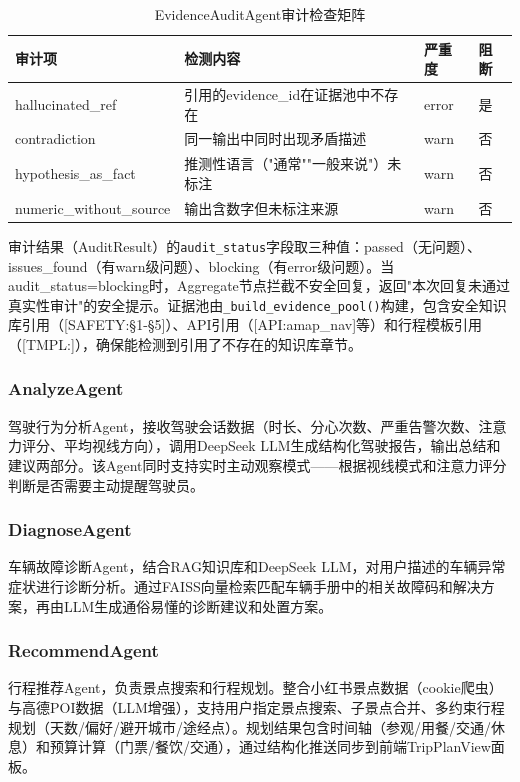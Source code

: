 \documentclass[a4paper]{article}
\begin{document}
\begin{table}[H]
  \centering
  \caption{EvidenceAuditAgent审计检查矩阵}
  \label{tab:audit_matrix}
  \begin{tabular}{llll}
  \toprule
  审计项 & 检测内容 & 严重度 & 阻断 \\
  \midrule
  hallucinated\_ref & 引用的evidence\_id在证据池中不存在 & error & 是 \\
  contradiction & 同一输出中同时出现矛盾描述 & warn & 否 \\
  hypothesis\_as\_fact & 推测性语言（"通常""一般来说"）未标注 & warn & 否 \\
  numeric\_without\_source & 输出含数字但未标注来源 & warn & 否 \\
  \bottomrule
  \end{tabular}
\end{table}

审计结果（AuditResult）的\texttt{audit\_status}字段取三种值：passed（无问题）、issues\_found（有warn级问题）、blocking（有error级问题）。当audit\_status=blocking时，Aggregate节点拦截不安全回复，返回"本次回复未通过真实性审计"的安全提示。证据池由\texttt{\_build\_evidence\_pool()}构建，包含安全知识库引用（[SAFETY:§1-§5]）、API引用（[API:amap\_nav]等）和行程模板引用（[TMPL:\*]），确保能检测到引用了不存在的知识库章节。

\subsubsection{AnalyzeAgent}

驾驶行为分析Agent，接收驾驶会话数据（时长、分心次数、严重告警次数、注意力评分、平均视线方向），调用DeepSeek LLM生成结构化驾驶报告，输出总结和建议两部分。该Agent同时支持实时主动观察模式——根据视线模式和注意力评分判断是否需要主动提醒驾驶员。

\subsubsection{DiagnoseAgent}

车辆故障诊断Agent，结合RAG知识库和DeepSeek LLM，对用户描述的车辆异常症状进行诊断分析。通过FAISS向量检索匹配车辆手册中的相关故障码和解决方案，再由LLM生成通俗易懂的诊断建议和处置方案。

\subsubsection{RecommendAgent}

行程推荐Agent，负责景点搜索和行程规划。整合小红书景点数据（cookie爬虫）与高德POI数据（LLM增强），支持用户指定景点搜索、子景点合并、多约束行程规划（天数/偏好/避开城市/途经点）。规划结果包含时间轴（参观/用餐/交通/休息）和预算计算（门票/餐饮/交通），通过结构化推送同步到前端TripPlanView面板。
\end{document}
